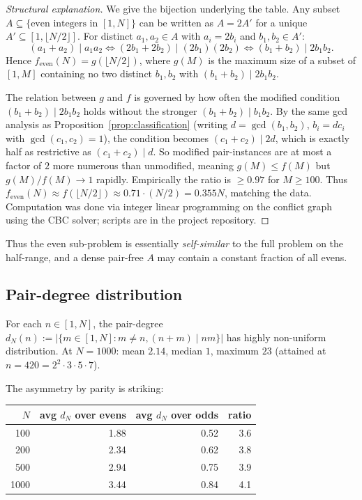 \documentclass[11pt]{amsart}
\theoremstyle{plain}
\theoremstyle{definition}
\begin{document}
\begin{proof}[Structural explanation]
We give the bijection underlying the table. Any subset $A \subseteq \{\text{even integers in } [1, N]\}$ can be written as $A = 2 A'$ for a unique $A' \subseteq [1, \lfloor N/2 \rfloor]$. For distinct $a_1, a_2 \in A$ with $a_i = 2 b_i$ and $b_1, b_2 \in A'$:
\[
  (a_1 + a_2) \mid a_1 a_2 \iff (2 b_1 + 2 b_2) \mid (2 b_1)(2 b_2) \iff (b_1 + b_2) \mid 2 b_1 b_2.
\]
Hence $f_{\text{even}}(N) = g(\lfloor N/2 \rfloor)$, where $g(M)$ is the maximum size of a subset of $[1, M]$ containing no two distinct $b_1, b_2$ with $(b_1 + b_2) \mid 2 b_1 b_2$.

The relation between $g$ and $f$ is governed by how often the modified condition $(b_1 + b_2) \mid 2 b_1 b_2$ holds without the stronger $(b_1 + b_2) \mid b_1 b_2$. By the same gcd analysis as Proposition~\ref{prop:classification} (writing $d = \gcd(b_1, b_2)$, $b_i = d c_i$ with $\gcd(c_1, c_2) = 1$), the condition becomes $(c_1 + c_2) \mid 2 d$, which is exactly half as restrictive as $(c_1 + c_2) \mid d$. So modified pair-instances are at most a factor of $2$ more numerous than unmodified, meaning $g(M) \leq f(M)$ but $g(M) / f(M) \to 1$ rapidly. Empirically the ratio is $\geq 0.97$ for $M \geq 100$. Thus $f_{\text{even}}(N) \approx f(\lfloor N/2 \rfloor) \approx 0.71 \cdot (N/2) = 0.355 N$, matching the data. Computation was done via integer linear programming on the conflict graph using the CBC solver; scripts are in the project repository.
\end{proof}

Thus the even sub-problem is essentially \emph{self-similar} to the full problem on the half-range, and a dense pair-free $A$ may contain a constant fraction of all evens.

\subsection{Pair-degree distribution}

For each $n \in [1, N]$, the pair-degree $d_N(n) := |\{m \in [1, N] : m \neq n, (n + m) \mid nm\}|$ has highly non-uniform distribution. At $N = 1000$: mean $2.14$, median $1$, maximum $23$ (attained at $n = 420 = 2^2 \cdot 3 \cdot 5 \cdot 7$).

The asymmetry by parity is striking:

\begin{center}
\begin{tabular}{r|r|r|r}
$N$  & avg $d_N$ over evens & avg $d_N$ over odds & ratio \\
\hline
100  & 1.88 & 0.52 & 3.6 \\
200  & 2.34 & 0.62 & 3.8 \\
500  & 2.94 & 0.75 & 3.9 \\
1000 & 3.44 & 0.84 & 4.1 \\
\end{tabular}
\end{center}
\end{document}
